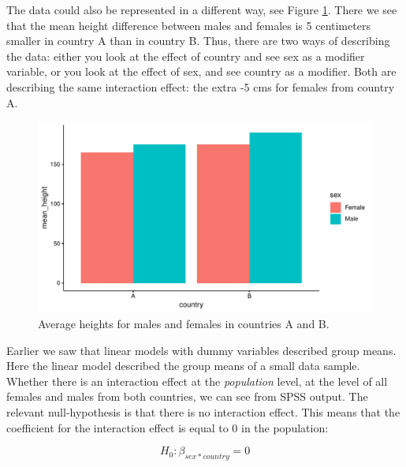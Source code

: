 \documentclass[]{book}\usepackage[]{graphicx}\usepackage[]{color}
\makeatletter
\def\maxwidth{ %
  \ifdim\Gin@nat@width>\linewidth
    \linewidth
  \else
    \Gin@nat@width
  \fi
}
\newenvironment{knitrout}{}{} %
\makeatother
\begin{document}
The data could also be represented in a different way, see Figure \ref{fig:country_sex2}. There we see that the mean height difference between males and females is 5 centimeters smaller in country A than in country B. Thus, there are two ways of describing the data: either you look at the effect of country and see sex as a modifier variable, or you look at the effect of sex, and see country as a modifier. Both are describing the same interaction effect: the extra -5 cms for females from country A.

\begin{knitrout}
\color{fgcolor}\begin{figure}

{\centering \includegraphics[width=\maxwidth]{figure/country_sex2-1} 

}

\caption[Average heights for males and females in countries A and B]{Average heights for males and females in countries A and B.}\label{fig:country_sex2}
\end{figure}


\end{knitrout}


Earlier we saw that linear models with dummy variables described group means. Here the linear model described the group means of a small data sample. Whether there is an interaction effect at the \textit{population} level, at the level of all females and males from both countries, we can see from SPSS output. The relevant null-hypothesis is that there is no interaction effect. This means that the coefficient for the interaction effect is equal to 0 in the population:

\begin{equation}
H_0: \beta_{sex*country}=0
\end{equation}
\end{document}
